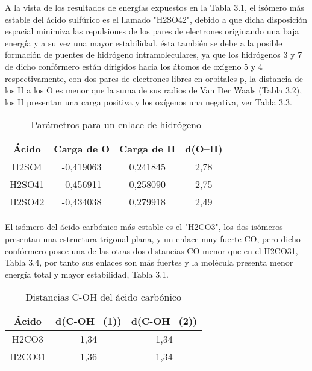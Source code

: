 A la vista de los resultados de energías expuestos en la Tabla 3.1, el isómero más estable del ácido sulfúrico es el llamado "H2SO42", debido a que dicha disposición espacial minimiza las repulsiones de los pares de electrones originando una baja energía y a su vez una mayor estabilidad, ésta también se debe a la posible formación de puentes de hidrógeno intramoleculares, ya que los hidrógenos 3 y 7 de dicho confórmero están dirigidos hacia los átomos de oxígeno 5 y 4 respectivamente, con dos pares de electrones libres en orbitales p, la distancia de los H a los O es menor que la suma de sus radios de Van Der Waals (Tabla 3.2), los H presentan una carga positiva y los oxígenos una negativa, ver Tabla 3.3.
\begin{table}[H]
    \centering
    \begin{tabular}{|c|c|c|c|}
    \hline
         Ácido & Carga de O & Carga de H & d(O--H) \\ \hline
        H2SO4 & -0,419063 & 0,241845 & 2,78 \\ \hline
        H2SO41 & -0,456911 & 0,258090 & 2,75 \\ \hline
        H2SO42 & -0,434038 & 0,279918 & 2,49 \\ \hline
    \end{tabular}
    \caption{Parámetros para un enlace de hidrógeno}
    \label{tab:my_label}
\end{table}

El isómero del ácido carbónico más estable es el "H2CO3", los dos isómeros presentan una estructura trigonal plana, y un enlace muy fuerte CO, pero dicho confórmero posee una de las otras dos distancias CO menor que en el H2CO31, Tabla 3.4, por tanto sus enlaces son más fuertes y la molécula presenta menor energía total y mayor estabilidad, Tabla 3.1.
\begin{table}[H]
    \centering
    \begin{tabular}{|c|c|c|}
    \hline
    Ácido & d(C-OH_{(1)}) & d(C-OH_{(2)}) \\ \hline
    H2CO3 & 1,34 & 1,34  \\ \hline
    H2CO31 & 1,36 & 1,34 \\ \hline 
    \end{tabular}
    \caption{Distancias C-OH del ácido carbónico}
    \label{tab:my_label}
\end{table}

